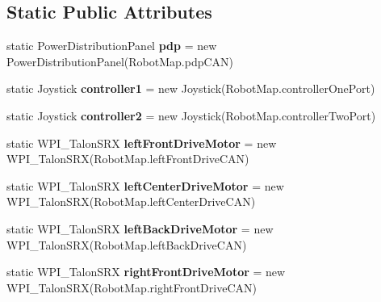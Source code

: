\subsection*{Static Public Attributes}
\begin{DoxyCompactItemize}
\item 
\mbox{\label{classfrc_1_1robot_1_1_o_i_a98d90326dfdaf14238d2f81c20c55f3f}} 
static Power\+Distribution\+Panel {\bfseries pdp} = new Power\+Distribution\+Panel(Robot\+Map.\+pdp\+C\+AN)
\item 
\mbox{\label{classfrc_1_1robot_1_1_o_i_a06db411c1eebb80d10f685c57954bac9}} 
static Joystick {\bfseries controller1} = new Joystick(Robot\+Map.\+controller\+One\+Port)
\item 
\mbox{\label{classfrc_1_1robot_1_1_o_i_a749a3f830f90057dc4fd65e7f34a3251}} 
static Joystick {\bfseries controller2} = new Joystick(Robot\+Map.\+controller\+Two\+Port)
\item 
\mbox{\label{classfrc_1_1robot_1_1_o_i_a3f39e281419ebd60b94126e87e3ec81d}} 
static W\+P\+I\+\_\+\+Talon\+S\+RX {\bfseries left\+Front\+Drive\+Motor} = new W\+P\+I\+\_\+\+Talon\+S\+RX(Robot\+Map.\+left\+Front\+Drive\+C\+AN)
\item 
\mbox{\label{classfrc_1_1robot_1_1_o_i_a8c33a9f0b9e366e48abd23ab01907e18}} 
static W\+P\+I\+\_\+\+Talon\+S\+RX {\bfseries left\+Center\+Drive\+Motor} = new W\+P\+I\+\_\+\+Talon\+S\+RX(Robot\+Map.\+left\+Center\+Drive\+C\+AN)
\item 
\mbox{\label{classfrc_1_1robot_1_1_o_i_a88080d092baf8ece2c22f2ceec4f6f8f}} 
static W\+P\+I\+\_\+\+Talon\+S\+RX {\bfseries left\+Back\+Drive\+Motor} = new W\+P\+I\+\_\+\+Talon\+S\+RX(Robot\+Map.\+left\+Back\+Drive\+C\+AN)
\item 
\mbox{\label{classfrc_1_1robot_1_1_o_i_ae055ab4ea5a306737c950b1bfddf7352}} 
static W\+P\+I\+\_\+\+Talon\+S\+RX {\bfseries right\+Front\+Drive\+Motor} = new W\+P\+I\+\_\+\+Talon\+S\+RX(Robot\+Map.\+right\+Front\+Drive\+C\+AN)
\item 
\mbox{\label{classfrc_1_1robot_1_1_o_i_a9be3279c18d1f3433d6b07c706eb1457}} 

\end{DoxyCompactItemize}
